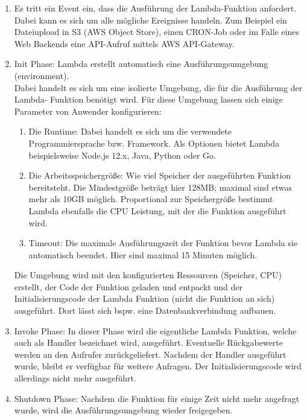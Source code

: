 \begin{enumerate}
\item Es tritt ein Event ein, dass die Ausführung der Lambda-Funktion anfordert. \\
    Dabei kann es sich um alle mögliche Ereignisse handeln. Zum Beispiel ein Dateiupload in S3 (AWS Object Store), einen CRON-Job oder im Falle eines Web Backends eine API-Aufruf mittels AWS API-Gateway.

\item Init Phase: Lambda erstellt automatisch eine Ausführungsumgebung (environment). \\
    Dabei handelt es sich um eine isolierte Umgebung, die für die Ausführung der Lambda- Funktion benötigt wird. Für diese Umgebung lassen sich einige Parameter von Anwender konfigurieren:
    
    \begin{enumerate}
        \item Die Runtime: Dabei handelt es sich um die verwendete Programmiersprache bzw. Framework. Als Optionen bietet Lambda beispielsweise Node.js 12.x, Java, Python oder Go.
        \item Die Arbeitsspeichergröße: Wie viel Speicher der ausgeführten Funktion bereitsteht. Die Mindestgröße beträgt hier 128MB; maximal sind etwas mehr als 10GB möglich. Proportional zur Speichergröße bestimmt Lambda ebenfalls die CPU Leistung, mit der die Funktion ausgeführt wird.
        \item Timeout: Die maximale Ausführungszeit der Funktion bevor Lambda sie automatisch beendet. Hier sind maximal 15 Minuten möglich.
    \end{enumerate}
    
    Die Umgebung wird mit den konfigurierten Ressourcen (Speicher, CPU) erstellt, der Code der Funktion geladen und entpackt und der Initialisierungscode der Lambda Funktion (nicht die Funktion an sich) ausgeführt. Dort lässt sich bspw. eine Datenbankverbindung aufbauen.
    
\item Invoke Phase: In dieser Phase wird die eigentliche Lambda Funktion, welche auch als Handler bezeichnet wird, ausgeführt. Eventuelle Rückgabewerte werden an den Aufrufer zurückgeliefert. Nachdem der Handler ausgeführt wurde, bleibt er verfügbar für weitere Anfragen. Der Initialisierungscode wird allerdings nicht mehr ausgeführt.
    
\item Shutdown Phase: Nachdem die Funktion für einige Zeit nicht mehr angefragt wurde, wird die Ausführungsumgebung wieder freigegeben. 
\end{enumerate}

